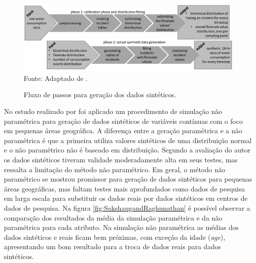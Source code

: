 \documentclass[
	12pt,				%
	openright,			%
	oneside,			%
	a4paper,			%
	english,			%
	brazil				%
	]{abntex2}
\begin{document}
		\begin{figure}[h!]
			\centering
			\caption{Fluxo de passos para geração dos dados sintéticos.}
			\includegraphics[width=\linewidth]{./figures/TrabalhosRelacionados/Kofinas21.png}
			\label{fig:kofinas}
			\footnotesize Fonte: Adaptado de \cite{kofinas2018methodology}.
		\end{figure}

		No estudo realizado por \cite{sakshaug2014nonparametric} foi aplicado um procedimento de simulação não paramétrica para geração de dados sintéticos de variáveis contínuas com o foco em pequenas áreas geográfica.
		A diferença entre a geração paramétrica e a não paramétrica é que a primeira utiliza valores sintéticos de uma distribuição normal e o não paramétrico não é baseado em distribuição. 
		Segundo a avaliação do autor os dados sintéticos tiveram validade moderadamente alta em seus testes, mas ressalta a limitação do método não paramétrico. 
		Em geral, o método não paramétrico se mostrou promissor para geração de dados sintéticos para pequenas áreas geográficas, mas faltam testes mais aprofundados como dados de pesquisa em larga escala para substituir os dados reais por dados sintéticos em centros de dados de pesquisa.
		Na figura \ref{fig:SakshaugandRaghunathan} é possível observar a comparação dos resultados da média da simulação paramétrica e da não paramétrica para cada atributo.
		Na simulação não paramétrica as médias dos dados sintéticos e reais ficam bem próximas, com exceção da idade (\emph{age}), apresentando um bom resultado para a troca de dados reais para dados sintéticos.
\end{document}
